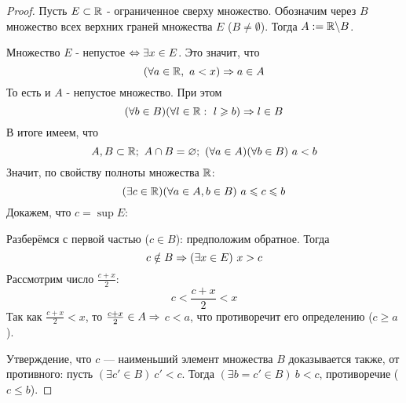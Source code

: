 \begin{proof}
    Пусть $E \subset \mathbb{R}$ - ограниченное сверху множество. Обозначим через
    $B$ множество всех верхних граней множества $E$ ($B \neq \emptyset$).
    Тогда $A := \mathbb{R} \backslash B$.

    Множество $E$ - непустое $\Leftrightarrow \exists x \in E$. Это значит, что
    \[
    	(\forall a \in \mathbb{R},\ a < x) \Rightarrow a \in A
    \]
    То есть и $A$ - непустое множество. При этом
    \[
    	(\forall b \in B) (\forall l \in \mathbb{R} :\  l \geqslant b) \Rightarrow l \in B
    \]
    В итоге имеем, что
    \[
    	A, B \subset \mathbb{R};\ A \cap B = \varnothing;\ (\forall a \in A)
        (\forall b \in B)\ a < b
    \]
    Значит, по свойству полноты множества $\mathbb{R}$:
    \[
    	(\exists c \in \mathbb{R})(\forall a \in A, b \in B)\ a \leqslant c \leqslant b
    \]
    Докажем, что $c = \sup E$:
    
    Разберёмся с первой частью ($c \in B$): предположим обратное. Тогда
    \[
        c \notin B \Rightarrow (\exists x \in E)\ x > c
    \]
    Рассмотрим число $\frac{c + x}{2}$:
    \[
        c < \frac{c + x}{2} < x
    \]
    Так как $\frac{c + x}{2} < x$, то $\frac{c + x}{2} \in A \Rightarrow$ $c < a$, что противоречит его определению ($c \ge a$).
    
    Утверждение, что $c$ --- наименьший элемент множества $B$
    доказывается также, от противного: пусть $(\exists c' \in B)
    \ c' < c$. Тогда $(\exists b = c' \in B)\ b < c$, противоречие ($c \le b$).
\end{proof}